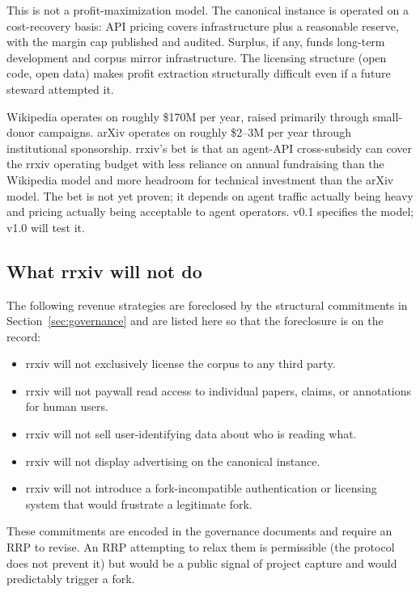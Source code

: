 \documentclass[11pt]{rrxiv}
\begin{document}
This is not a profit-maximization model. The canonical instance is operated on a cost-recovery basis: API pricing covers infrastructure plus a reasonable reserve, with the margin cap published and audited. Surplus, if any, funds long-term development and corpus mirror infrastructure. The licensing structure (open code, open data) makes profit extraction structurally difficult even if a future steward attempted it.

\begin{rrxivremark}
Wikipedia operates on roughly \$170M per year, raised primarily through small-donor campaigns. arXiv operates on roughly \$2--3M per year through institutional sponsorship. rrxiv's bet is that an agent-API cross-subsidy can cover the rrxiv operating budget with less reliance on annual fundraising than the Wikipedia model and more headroom for technical investment than the arXiv model. The bet is not yet proven; it depends on agent traffic actually being heavy and pricing actually being acceptable to agent operators. v0.1 specifies the model; v1.0 will test it.
\end{rrxivremark}

\subsection{What rrxiv will not do}

The following revenue strategies are foreclosed by the structural commitments in Section~\ref{sec:governance} and are listed here so that the foreclosure is on the record:

\begin{itemize}[leftmargin=2em]
\item rrxiv will not exclusively license the corpus to any third party.
\item rrxiv will not paywall read access to individual papers, claims, or annotations for human users.
\item rrxiv will not sell user-identifying data about who is reading what.
\item rrxiv will not display advertising on the canonical instance.
\item rrxiv will not introduce a fork-incompatible authentication or licensing system that would frustrate a legitimate fork.
\end{itemize}

These commitments are encoded in the governance documents and require an RRP to revise. An RRP attempting to relax them is permissible (the protocol does not prevent it) but would be a public signal of project capture and would predictably trigger a fork.
\end{document}

